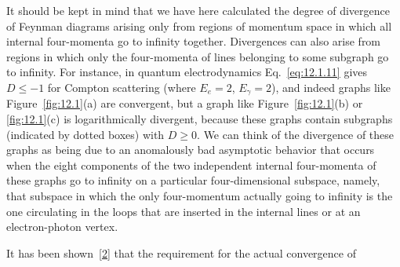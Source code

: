 

It should be kept in mind that we have here calculated the degree of divergence
of Feynman diagrams arising only from regions of momentum space in which all
internal four-momenta go to infinity together. Divergences can also arise from
regions in which only the four-momenta of lines belonging to some subgraph go
to infinity. For instance, in quantum electrodynamics
Eq.~\eqref{eq:12.1.11} gives $D\leq-1$ for Compton scattering (where $E_e=2$,
$E_\gamma=2$), and indeed graphs like Figure~\ref{fig:12.1}(a) are convergent,
but a graph like Figure~\ref{fig:12.1}(b) or \ref{fig:12.1}(c) is
logarithmically divergent, because these graphs contain subgraphs (indicated
by dotted boxes) with $D\geq0$. We can think of the divergence of these graphs
as being due to an anomalously bad asymptotic behavior that occurs when the
eight components of the two independent internal four-momenta of these graphs
go to infinity on a particular four-dimensional subspace, namely, that
subspace in which the only four-momentum actually going to infinity is the one
circulating in the loops that are inserted in the internal lines or at an
electron-photon vertex.

It has been shown~\hyperref[ref:12.2]{[2]} that the requirement for the actual
convergence of
